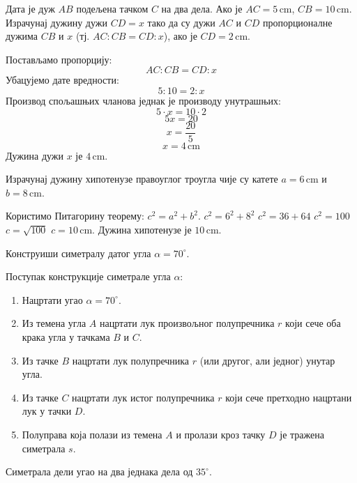 \documentclass[11pt,a5paper,addpoints,noanswers]{exam}
\def\measure#1#2{#1 \, \mathrm{#2}}
\begin{document}
\begin{questions}
\ifprintanswers\else\newpage\fi %

\question[4]
 Дата је дуж $AB$ подељена тачком $C$ на два дела. Ако је $AC=\measure{5}{cm}$, $CB=\measure{10}{cm}$. Израчунај дужину дужи $CD=x$ тако да су дужи $AC$ и $CD$ пропорционалне дужима $CB$ и $x$ (тј. $AC:CB=CD:x$), ако је $CD=\measure{2}{cm}$.
 \begin{solution}[\stretch 7] %
  Постављамо пропорцију:
  $$ AC:CB = CD:x $$
  Убацујемо дате вредности:
  $$ 5:10 = 2:x $$
  Производ спољашњих чланова једнак је производу унутрашњих:
  $$ 5 \cdot x = 10 \cdot 2 $$
  $$ 5x = 20 $$
  $$ x = \frac{20}{5} $$
  $$ x = \measure{4}{cm} $$
  Дужина дужи $x$ је $\measure{4}{cm}$.
 \end{solution}
 \answerline

\question[3]
 Израчунај дужину хипотенузе правоуглог троугла чије су катете $a=\measure{6}{cm}$ и $b=\measure{8}{cm}$.
 \begin{solution}[\stretch 4] %
  Користимо Питагорину теорему: $c^2 = a^2 + b^2$.
  $c^2 = 6^2 + 8^2$
  $c^2 = 36 + 64$
  $c^2 = 100$
  $c = \sqrt{100}$
  $c = \measure{10}{cm}$.
  Дужина хипотенузе је $\measure{10}{cm}$.
 \end{solution}
 \answerline

\ifprintanswers\else\newpage\fi %

\question[4]
 Конструиши симетралу датог угла $\alpha = 70^\circ$.
 \begin{solution}[\stretch 7] %
  Поступак конструкције симетрале угла $\alpha$:
  \begin{enumerate}
      \item Нацртати угао $\alpha = 70^\circ$.
      \item Из темена угла $A$ нацртати лук произвољног полупречника $r$ који сече оба крака угла у тачкама $B$ и $C$.
      \item Из тачке $B$ нацртати лук полупречника $r$ (или другог, али једног) унутар угла.
      \item Из тачке $C$ нацртати лук истог полупречника $r$ који сече претходно нацртани лук у тачки $D$.
      \item Полуправа која полази из темена $A$ и пролази кроз тачку $D$ је тражена симетрала $s$.
  \end{enumerate}
  Симетрала дели угао на два једнака дела од $35^\circ$.
 \end{solution}
 \answerline


\end{questions}
\end{document}

